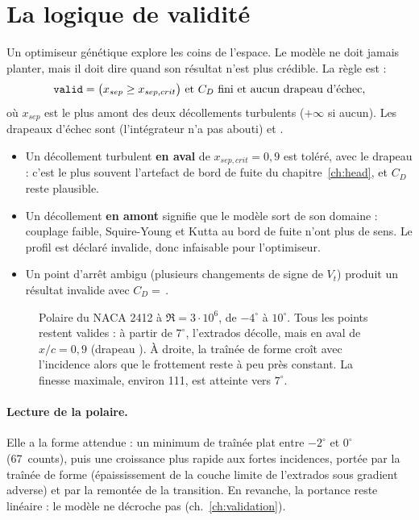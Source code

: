 \section{La logique de validité}
Un optimiseur génétique explore les coins de l'espace. Le modèle ne doit jamais planter, mais il doit dire quand son résultat n'est plus crédible. La règle est :
\[
\code{valid}=\big(x_{sep}\ge x_{sep,crit}\big)\ \text{et}\ C_D\ \text{fini}\ \text{et aucun drapeau d'échec},
\]
où $x_{sep}$ est le plus amont des deux décollements turbulents ($+\infty$ si aucun). Les drapeaux d'échec sont  (l'intégrateur n'a pas abouti) et .
\begin{itemize}
\item Un décollement turbulent \textbf{en aval} de $x_{sep,crit}=0{,}9$ est toléré, avec le drapeau  : c'est le plus souvent l'artefact de bord de fuite du chapitre~\ref{ch:head}, et $C_D$ reste plausible.
\item Un décollement \textbf{en amont} signifie que le modèle sort de son domaine : couplage faible, Squire-Young et Kutta au bord de fuite n'ont plus de sens. Le profil est déclaré invalide, donc infaisable pour l'optimiseur.
\item Un point d'arrêt ambigu (plusieurs changements de signe de $V_t$) produit un résultat invalide avec $C_D=$\,.
\end{itemize}

\begin{figure}[htbp]
\centering

\caption{Polaire du NACA 2412 à $\Re=3\cdot10^6$, de $-4^\circ$ à $10^\circ$. Tous les points restent valides : à partir de $7^\circ$, l'extrados décolle, mais en aval de $x/c=0{,}9$ (drapeau ). À droite, la traînée de forme croît avec l'incidence alors que le frottement reste à peu près constant. La finesse maximale, environ 111, est atteinte vers $7^\circ$.}\label{fig:polaire}
\end{figure}

\paragraph{Lecture de la polaire.} Elle a la forme attendue : un minimum de traînée plat entre $-2^\circ$ et $0^\circ$ (67~counts), puis une croissance plus rapide aux fortes incidences, portée par la traînée de forme (épaississement de la couche limite de l'extrados sous gradient adverse) et par la remontée de la transition. En revanche, la portance reste linéaire : le modèle ne décroche pas (ch.~\ref{ch:validation}).

